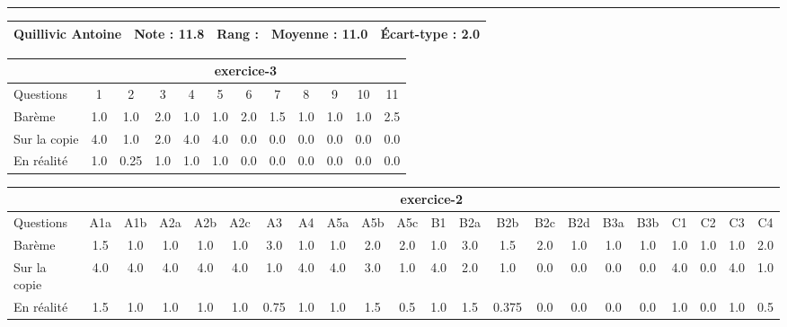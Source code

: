 \documentclass[a4paper, landscape, 10pt]{article}
\begin{document}
  \vspace{0.3cm}
  \hrule
  \vspace{0.3cm}

  \begin{minipage}{\textwidth}
    { \bf
    \begin{tabular}{|c|*{4}{c|}}
    \hline
      Quillivic Antoine & Note : 11.8 & Rang :  & Moyenne : 11.0 & \'Ecart-type : 2.0 \\
    \hline
    \end{tabular}
    }
    
      \begin{tabular}{|l|*{ 11 }{c|}}
        \hline
        & \multicolumn{ 11 }{c|}{ exercice-3 } \\
        \hline
        Questions & 1&2&3&4&5&6&7&8&9&10&11 \\
        \hline
        Barème & 1.0&1.0&2.0&1.0&1.0&2.0&1.5&1.0&1.0&1.0&2.5 \\
        \hline
        Sur la copie & 4.0&1.0&2.0&4.0&4.0&0.0&0.0&0.0&0.0&0.0&0.0 \\
        \hline
        En réalité & 1.0&0.25&1.0&1.0&1.0&0.0&0.0&0.0&0.0&0.0&0.0 \\
        \hline
      \end{tabular}
    
      \begin{tabular}{|l|*{ 21 }{c|}}
        \hline
        & \multicolumn{ 21 }{c|}{ exercice-2 } \\
        \hline
        Questions & A1a&A1b&A2a&A2b&A2c&A3&A4&A5a&A5b&A5c&B1&B2a&B2b&B2c&B2d&B3a&B3b&C1&C2&C3&C4 \\
        \hline
        Barème & 1.5&1.0&1.0&1.0&1.0&3.0&1.0&1.0&2.0&2.0&1.0&3.0&1.5&2.0&1.0&1.0&1.0&1.0&1.0&1.0&2.0 \\
        \hline
        Sur la copie & 4.0&4.0&4.0&4.0&4.0&1.0&4.0&4.0&3.0&1.0&4.0&2.0&1.0&0.0&0.0&0.0&0.0&4.0&0.0&4.0&1.0 \\
        \hline
        En réalité & 1.5&1.0&1.0&1.0&1.0&0.75&1.0&1.0&1.5&0.5&1.0&1.5&0.375&0.0&0.0&0.0&0.0&1.0&0.0&1.0&0.5 \\
        \hline
      \end{tabular}
    

\end{minipage}
\end{document}
